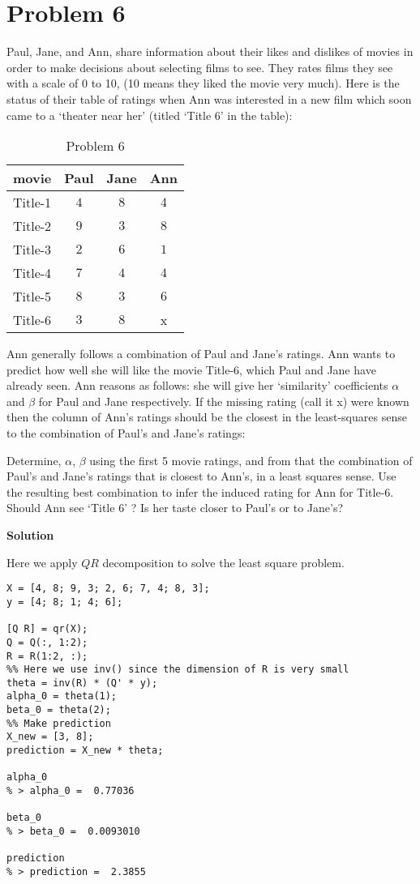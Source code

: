 \documentclass[12pt,oneside,a4paper]{article}
\newcommand{\problem}[1]
{
    \clearpage
    \section*{Problem {#1}}
}
\newcommand{\solution}
{
    \vspace{15pt}
    \noindent\ignorespaces\textbf{\large Solution}\par
}
\begin{document}
\problem{6}
Paul, Jane, and Ann, share information about their likes and dislikes of movies in order to make decisions about selecting films to see. They rates films they see with a scale of 0 to 10, (10 means they liked the movie very much). Here is the status of their table of ratings when Ann was interested in a new film which soon came to a `theater near her' (titled `Title 6' in the table):\par
\begin{table}[ht!]
\centering
\caption{Problem 6}
\begin{tabular}{lccc}
\toprule
 \multicolumn{1}{c}{ movie } & \multicolumn{1}{c}{ Paul } & \multicolumn{1}{c}{ Jane } & \multicolumn{1}{c}{ Ann } \\
\midrule
 Title-1 & $4$ & $8$ & $4$ \\
 Title-2 & $9$ & $3$ & $8$ \\
 Title-3 & $2$ & $6$ & $1$ \\
 Title-4 & $7$ & $4$ & $4$ \\
 Title-5 & $8$ & $3$ & $6$ \\
\midrule
 Title-6 & $3$ & $8$ & x \\
\bottomrule
\end{tabular}
\end{table}

Ann generally follows a combination of Paul and Jane's ratings. Ann wants to predict how well she will like the movie Title-6, which Paul and Jane have already seen. Ann reasons as follows: she will give her `similarity' coefficients $\alpha$ and $\beta$ for Paul and Jane respectively. If the missing rating (call it x) were known then the column of Ann's ratings should be the closest in the least-squares sense to the combination of Paul's and Jane's ratings:\par
Determine, $\alpha$, $\beta$ using the first 5 movie ratings, and from that the combination of Paul's and Jane's ratings that is closest to Ann's, in a least squares sense. Use the resulting best combination to infer the induced rating for Ann for Title-6. Should Ann see `Title 6' ? Is her taste closer to Paul's or to Jane's?

\clearpage
\solution
Here we apply $QR$ decomposition to solve the least square problem.

\begin{lstlisting}
X = [4, 8; 9, 3; 2, 6; 7, 4; 8, 3];
y = [4; 8; 1; 4; 6];

[Q R] = qr(X);
Q = Q(:, 1:2);
R = R(1:2, :);
%% Here we use inv() since the dimension of R is very small
theta = inv(R) * (Q' * y);
alpha_0 = theta(1);
beta_0 = theta(2);
%% Make prediction
X_new = [3, 8];
prediction = X_new * theta;

alpha_0
% > alpha_0 =  0.77036

beta_0
% > beta_0 =  0.0093010

prediction
% > prediction =  2.3855
\end{lstlisting}
\end{document}
